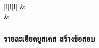 \begin{table}[H]
\begin{tabular}{|l|l|l|}
  \hline
                       & \\[-\rowheight]
  \printcelltop                                     & \\
  \hline
  \end{tabular}
  \caption{รายละเอียดยูสเคส คัดลอกหมวดหมู่คำถามสาธารณะ}
  \label{Table:copyPublicCategory}
\end{table}

\subsubsection{รายละเอียดยูสเคส สร้างข้อสอบ}

